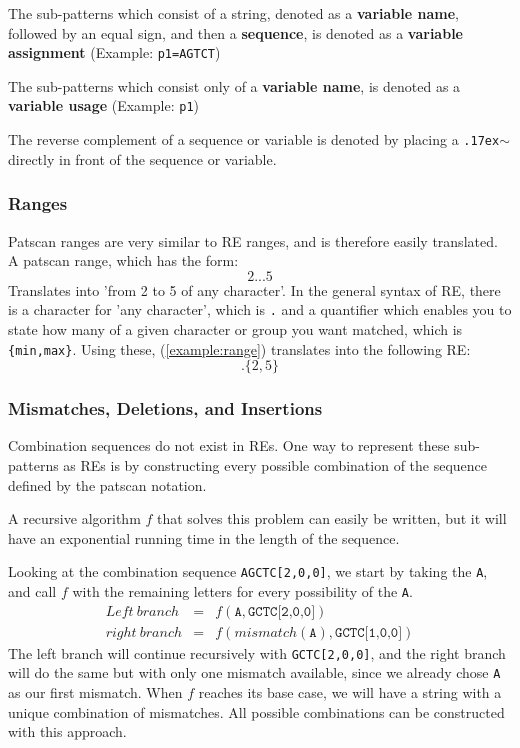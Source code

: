 \documentclass[12pt]{article}
\theoremstyle{definition}
\begin{document}
The sub-patterns which consist of a string, denoted as a \textbf{variable name}, followed by an equal sign, and then a \textbf{sequence}, is denoted as a \textbf{variable assignment} (Example: \texttt{p1=AGTCT})

The sub-patterns which consist only of a \textbf{variable name}, is denoted as a \textbf{variable usage} (Example: \texttt{p1})

The reverse complement of a sequence or variable is denoted by placing a \texttt{{\raise.17ex\hbox{$\scriptstyle\mathtt{\sim}$}}} directly in front of the sequence or variable.


\subsubsection{Ranges}

Patscan ranges are very similar to RE ranges, and is therefore easily translated. A patscan range, which has the form:
\begin{equation}
\label{example:range}
	2...5
\end{equation}
Translates into 'from 2 to 5 of any character'. In the general syntax of RE, there is a character for 'any character', which is \texttt{.} and a quantifier which enables you to state how many of a given character or group you want matched, which is \texttt{\{min,max\}}. Using these, (\ref{example:range}) translates into the following RE:
\begin{equation}
.\{2,5\}
\end{equation}

\subsubsection{Mismatches, Deletions, and Insertions}

Combination sequences do not exist in REs. One way to represent these sub-patterns as REs is by constructing every possible combination of the sequence defined by the patscan notation.

A recursive algorithm $f$ that solves this problem can easily be written, but it will have an exponential running time in the length of the sequence. 

\begin{example}[label=example:recursion]
Looking at the combination sequence \texttt{AGCTC[2,0,0]}, we start by taking the \texttt{A}, and call $f$ with the remaining letters for every possibility of the \texttt{A}.
\begin{eqnarray}
	Left\ branch &=& f(\texttt{A}, \texttt{GCTC[2,0,0]}) \\
	right\ branch &=& f(mismatch(\texttt{A}), \texttt{GCTC[1,0,0]})
\end{eqnarray}
The left branch will continue recursively with \texttt{GCTC[2,0,0]}, and the right branch will do the same but with only one mismatch available, since we already chose \texttt{A} as our first mismatch. When $f$ reaches its base case, we will have a string with a unique combination of mismatches. All possible combinations can be constructed with this approach.
\end{example}
\end{document}

